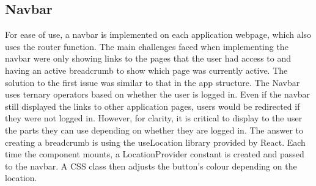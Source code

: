 \subsection{Navbar}
For ease of use, a navbar is implemented on each application webpage, which also uses the router function. The main challenges faced when implementing the navbar were only showing links to the pages that the user had access to and having an active breadcrumb to show which page was currently active. 
The solution to the first issue was similar to that in the app structure. The Navbar uses ternary operators based on whether the user is logged in. Even if the navbar still displayed the links to other application pages, users would be redirected if they were not logged in. However, for clarity, it is critical to display to the user the parts they can use depending on whether they are logged in. 
The answer to creating a breadcrumb is using the useLocation library provided by React. Each time the component mounts, a LocationProvider constant is created and passed to the navbar. A CSS class then adjusts the button's colour depending on the location.

